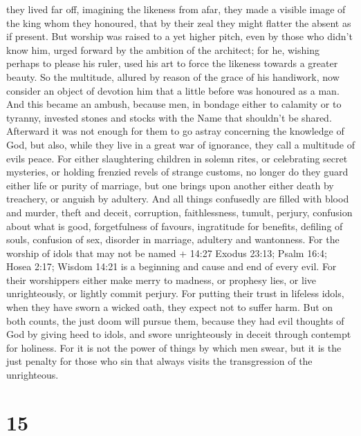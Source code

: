 they lived far off, imagining the likeness from afar, they made a
visible image of the king whom they honoured, that by their zeal they
might flatter the absent as if present.  But worship was
raised to a yet higher pitch, even by those who didn't know him, urged
forward by the ambition of the architect;  for he, wishing
perhaps to please his ruler, used his art to force the likeness towards
a greater beauty.  So the multitude, allured by reason of
the grace of his handiwork, now consider an object of devotion him that
a little before was honoured as a man.  And this became an
ambush, because men, in bondage either to calamity or to tyranny,
invested stones and stocks with the Name that shouldn't be shared.
 Afterward it was not enough for them to go astray
concerning the knowledge of God, but also, while they live in a great
war of ignorance, they call a multitude of evils peace. 
For either slaughtering children in solemn rites, or celebrating secret
mysteries, or holding frenzied revels of strange customs, 
no longer do they guard either life or purity of marriage, but one
brings upon another either death by treachery, or anguish by adultery.
 And all things confusedly are filled with blood and
murder, theft and deceit, corruption, faithlessness, tumult, perjury,
 confusion about what is good, forgetfulness of favours,
ingratitude for benefits, defiling of souls, confusion of sex, disorder
in marriage, adultery and wantonness.  For the worship of
idols that may not be named + 14:27 Exodus 23:13; Psalm 16:4; Hosea
2:17; Wisdom 14:21 is a beginning and cause and end of every evil.
 For their worshippers either make merry to madness, or
prophesy lies, or live unrighteously, or lightly commit perjury.
 For putting their trust in lifeless idols, when they have
sworn a wicked oath, they expect not to suffer harm.  But
on both counts, the just doom will pursue them, because they had evil
thoughts of God by giving heed to idols, and swore unrighteously in
deceit through contempt for holiness.  For it is not the
power of things by which men swear, but it is the just penalty for those
who sin that always visits the transgression of the unrighteous.

\hypertarget{section-14}{%
\section{15}\label{section-14}}

